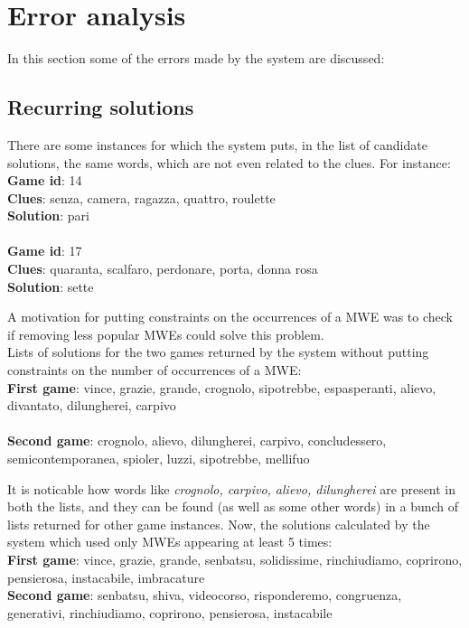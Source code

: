 \documentclass[twoside,twocolumn]{article}
\newenvironment{myfont}{\small\fontfamily{pag}\selectfont}{\par}
\begin{document}
\section{Error analysis}
In this section some of the errors made by the system are discussed:
	\subsection{Recurring solutions}
	There are some instances for which the system puts, in the list of candidate solutions, the same words, which are not even related to the clues. For instance: \\
	\begin{myfont}
	\textbf{Game id}: 14 \\
	\textbf{Clues}: senza, camera, ragazza, quattro, roulette \\
	\textbf{Solution}: pari \\ \\
	\textbf{Game id}: 17 \\
	\textbf{Clues}: quaranta, scalfaro, perdonare, porta, donna rosa \\
	\textbf{Solution}: sette \\
	\end{myfont}
	A motivation for putting constraints on the occurrences of a MWE was to check if removing less popular MWEs could solve this problem. \\
	Lists of solutions for the two games returned by the system without putting constraints on the number of occurrences of a MWE: \\
	\begin{myfont}\textbf{First game}: vince, grazie, grande, crognolo, sipotrebbe, espasperanti, alievo, divantato, dilungherei, carpivo \\ \\
	\textbf{Second game}:  crognolo, alievo, dilungherei, carpivo, concludessero, semicontemporanea, spioler, luzzi, sipotrebbe, mellifuo\\ 		\end{myfont}
	It is noticable how words like \textit{crognolo, carpivo, alievo, dilungherei} are present in both the lists, and they can be found (as well as some other words) in a bunch of lists returned for other game instances. Now, the solutions calculated by the system which used only MWEs appearing at least 5 times: \\
	\begin{myfont}\textbf{First game}: vince, grazie, grande, senbatsu, solidissime, rinchiudiamo, coprirono, pensierosa, instacabile, imbracature \\
	\textbf{Second game}: senbatsu, shiva, videocorso, risponderemo, congruenza, generativi, rinchiudiamo, coprirono, pensierosa, instacabile \\	\end{myfont}
\end{document}
